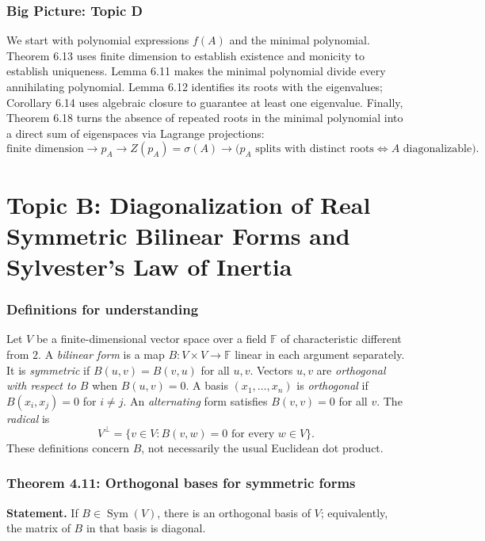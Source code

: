 \documentclass[11pt,a4paper]{article}
\newcommand{\F}{\mathbb F}
\begin{document}
\section*{Big Picture: Topic D}
We start with polynomial expressions \(f(A)\) and the minimal polynomial.
Theorem 6.13 uses finite dimension to establish existence and monicity
to establish uniqueness. Lemma 6.11 makes the minimal polynomial divide
every annihilating polynomial. Lemma 6.12 identifies its roots with
the eigenvalues; Corollary 6.14 uses algebraic closure to guarantee
at least one eigenvalue. Finally, Theorem 6.18 turns the absence
of repeated roots in the minimal polynomial into a direct sum of
eigenspaces via Lagrange projections:
\[
\boxed{\text{finite dimension}\longrightarrow p_A
\longrightarrow Z(p_A)=\sigma(A)
\longrightarrow
\bigl(p_A\text{ splits with distinct roots}
\iff A\text{ diagonalizable}\bigr).}
\]


\clearpage
\part*{Topic B: Diagonalization of Real Symmetric Bilinear Forms and Sylvester's Law of Inertia}

\section*{Definitions for understanding}
Let \(V\) be a finite-dimensional vector space over a field \(\F\) of characteristic different from \(2\).
A \emph{bilinear form} is a map \(B:V\times V\to\F\) linear in each argument separately.
It is \emph{symmetric} if \(B(u,v)=B(v,u)\) for all \(u,v\).
Vectors \(u,v\) are \emph{orthogonal with respect to \(B\)} when \(B(u,v)=0\).
A basis \((x_1,\ldots,x_n)\) is \emph{orthogonal} if \(B(x_i,x_j)=0\) for \(i\neq j\).
An \emph{alternating} form satisfies \(B(v,v)=0\) for all \(v\).
The \emph{radical} is
\[
V^\perp=\{v\in V:B(v,w)=0\text{ for every }w\in V\}.
\]
These definitions concern \(B\), not necessarily the usual Euclidean dot product.

\section{Theorem 4.11: Orthogonal bases for symmetric forms}
\textbf{Statement.} If \(B\in\operatorname{Sym}(V)\), there is an orthogonal basis of \(V\); equivalently, the matrix of \(B\) in that basis is diagonal.
\end{document}
